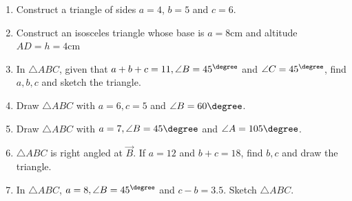 \renewcommand{\theequation}{\theenumi}
\begin{enumerate}[label=\thesubsection.\arabic*.,ref=\thesubsection.\theenumi]

\item Construct a triangle of sides $a=4$, $b=5$  and $c=6$.  
\item Construct an isosceles triangle whose base is $a=8$cm and altitude $AD=h=4$cm 
\item In $\triangle ABC$,  given that $a+b+c = 11, \angle B = 45^{\degree}$ and $\angle C = 45^{\degree}$, 
find 
$a,b,c$ and sketch the triangle.
\item Draw $\triangle ABC$ with $a = 6, c = 5$ and $\angle B = 60 \degree$. 
\item Draw $\triangle ABC$ with $a = 7, \angle B = 45\degree$ and $\angle A = 105 \degree$. 
\item $\triangle ABC$ is right angled at $\vec{B}$.  If $a = 12$ and $b+c = 18$, find $b,c$ and draw the triangle.
\item In $\triangle ABC$,  $a = 8, \angle B = 45^{\degree}$ and $c-b = 3.5$.
Sketch $\triangle ABC$.


\end{enumerate}
